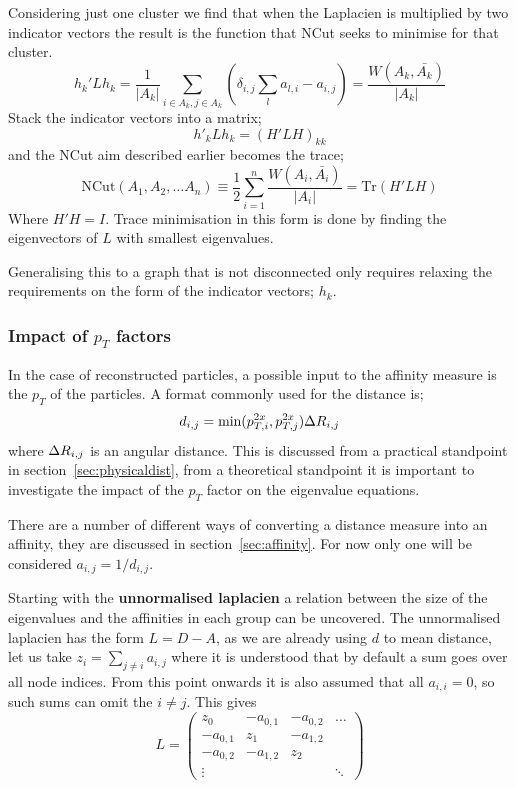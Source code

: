 Considering just one cluster we find that when the Laplacien is multiplied by two indicator vectors
the result is the function that NCut seeks to minimise for that cluster.
\begin{equation}
    h_k'Lh_k = \frac{1}{|A_k|}\sum_{i \in A_k, j \in A_k} \left(\delta_{i, j}\sum_{l} a_{l, i} - a_{i, j} \right) = \frac{W(A_k, \bar{A_k})}{|A_k|}
\end{equation}
Stack the indicator vectors into a matrix;
\begin{equation} h'_k L h_k = (H'L H)_{kk}\end{equation}
and the NCut aim described earlier becomes the trace;
\begin{equation} \text{NCut}(A_1,A_2, \dots A_n) \equiv \frac{1}{2} \sum_{i=1}^n \frac{W(A_i, \bar{A_i})}{|A_i|} = \text{Tr}(H'LH)\end{equation}
Where \(H'H = I\).
Trace minimisation in this form is done
by finding the eigenvectors of \(L\) with smallest 
eigenvalues.

Generalising this to a graph that is not disconnected
only requires relaxing the requirements on the form of the indicator vectors; \(h_k\).

\subsubsection{Impact of \(p_T\) factors}
In the case of reconstructed particles, a possible input to the affinity measure is the \(p_T\) of the particles.
A format commonly used for the distance is;
\begin{equation}d_{i,j} = \text{min}(p_{T,i}^{2x}, p_{T,j}^{2x}) \Delta R{}_{i,j}\end{equation}
where \(\Delta R{}_{i,j}\) is an angular distance.
This is discussed from a practical standpoint in section~\ref{sec:physicaldist},
from a theoretical standpoint it is important to investigate the impact of the \(p_T\) factor on the eigenvalue equations.

There are a number of different ways of converting a distance measure into an affinity, they are discussed in section~\ref{sec:affinity}.
For now only one will be considered \(a_{i,j} = 1/d_{i,j}\).

Starting with the \textbf{unnormalised laplacien} a relation between the size of the eigenvalues and the affinities in each group can be uncovered.
The unnormalised laplacien has the form \(L = D -A\), as we are already using \(d\) to mean distance,
let us take \(z_i = \sum_{j\neq i} a_{i,j}\) where it is understood that by default a sum goes over all node indices.
From this point onwards it is also assumed that all \(a_{i,i} = 0\), so such sums can omit the \(i \ne j\).
This gives 
\begin{equation}
    L = 
    \begin{pmatrix}
        z_0 & -a_{0,1} & -a_{0,2} & \hdots \\
        -a_{0,1} & z_1 & -a_{1,2} & \\
        -a_{0,2} & -a_{1,2} & z_2 & \\
        \vdots   &          &     & \ddots 
    \end{pmatrix}
\end{equation}

